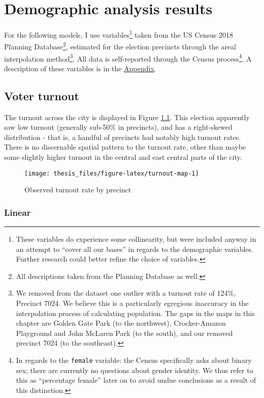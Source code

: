 \documentclass[12pt,twoside]{reedthesis}
\begin{document}
\hypertarget{demo-results}{%
\chapter{Demographic analysis results}\label{demo-results}}

For the following models, I use variables\footnote{These variables do experience some collinearity, but were included anyway in an attempt to ``cover all our bases'' in regards to the demographic variables. Further research could better refine the choice of variables.} taken from the US Census 2018 Planning Database\footnote{All descriptions taken from the Planning Database as well.}, estimated for the election precincts through the areal interpolation method\footnote{We removed from the dataset one outlier with a turnout rate of 124\%, Precinct 7024. We believe this is a particularly egregious inaccuracy in the interpolation process of calculating population. The gaps in the maps in this chapter are Golden Gate Park (to the northwest), Crocker-Amazon Playground and John McLaren Park (to the south), and our removed precinct 7024 (to the southeast).}. All data is self-reported through the Census process\footnote{In regards to the \texttt{female} variable: the Census specifically asks about binary sex; there are currently no questions about gender identity. We thus refer to this as ``percentage female'' later on to avoid undue conclusions as a result of this distinction.}. A description of these variables is in the \protect\hyperlink{appendix}{Appendix}.

\hypertarget{voter-turnout}{%
\section{Voter turnout}\label{voter-turnout}}

The turnout across the city is displayed in Figure \ref{fig:turnout-map}. This election apparently saw low turnout (generally sub-50\% in precincts), and has a right-skewed distribution - that is, a handful of precincts had notably high turnout rates. There is no discernable spatial pattern to the turnout rate, other than maybe some slightly higher turnout in the central and east central parts of the city.
\begin{figure}
\texttt{[image: thesis\_files/figure-latex/turnout-map-1]} \caption{Observed turnout rate by precinct}\label{fig:turnout-map}
\end{figure}
\hypertarget{linear}{%
\subsection{Linear}\label{linear}}
\end{document}
